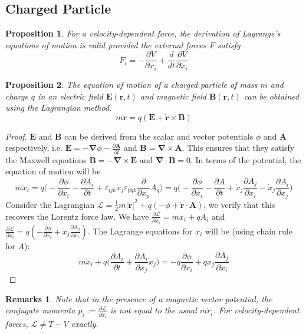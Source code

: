 \documentclass[a4paper]{article}
\newtheorem{remarks}{Remarks}[section]
\newtheorem{prop}{Proposition}[section]
\theoremstyle{new}
\begin{document}
\subsection{Charged Particle}
\begin{prop}
For a velocity-dependent force, the derivation of Lagrange's equations of motion is valid provided the external forces $F$ satisfy
$$F_i=-\frac{\partial V}{\partial x_i}+\frac{d}{dt}\frac{\partial V}{\partial\dot{x}_i}$$
\end{prop}
\begin{prop}
The equation of motion of a charged particle of mass $m$ and charge $q$ in an electric field $\mathbf{E}(\mathbf{r},t)$ and magnetic field $\mathbf{B}(\mathbf{r},t)$ can be obtained using the Lagrangian method.
$$m\mathbf{\ddot{r}}=q(\mathbf{E}+\mathbf{\dot{r}}\times\mathbf{B})$$
\end{prop}
\begin{proof}
$\mathbf{E}$ and $\mathbf{B}$ can be derived from the scalar and vector potentials $\phi$ and $\mathbf{A}$ respectively, i.e. $\mathbf{E}=-\boldsymbol{\nabla}\phi-\frac{\partial\mathbf{A}}{\partial t}$ and $\mathbf{B}=\boldsymbol{\nabla}\times\mathbf{A}$. This ensures that they satisfy the Maxwell equations $\mathbf{\dot{B}}=-\boldsymbol{\nabla}\times\mathbf{E}$ and $\boldsymbol{\nabla}\cdot\mathbf{B}=0$. In terms of the potential, the equation of motion will be
$$m\ddot{x}_i=q\bigg(-\frac{\partial\phi}{\partial x_i}-\frac{\partial A_i}{\partial t}+\varepsilon_{ijk}\dot{x}_j\varepsilon_{pqk}\frac{\partial}{\partial x_p}A_q\bigg)=q\bigg(-\frac{\partial\phi}{\partial x_i}-\frac{\partial A}{\partial t}+\dot{x}_j\frac{\partial A_j}{\partial x_i}-\dot{x}_j\frac{\partial A_i}{\partial x_j}\bigg)$$
Consider the Lagrangian $\mathcal{L}=\frac{1}{2}m|\mathbf{\dot{r}}|^2+q(-\phi+\mathbf{\dot{r}}\cdot\mathbf{A})$, we verify that this recovers the Lorentz force law. We have $\frac{\partial\mathcal{L}}{\partial\dot{x}_i}=m\dot{x}_i+qA_i$ and $\frac{\partial\mathcal{L}}{\partial x_i}=q(-\frac{\partial\phi}{\partial x_i}+\dot{x}_j\frac{\partial A_j}{\partial x_i})$. The Lagrange equations for $x_i$ will be (using chain rule for $A$):
$$m\ddot{x}_i+q\bigg(\frac{\partial A_i}{\partial t}+\frac{\partial A_i}{\partial x_j}\dot{x}_j\bigg)=-q\frac{\partial\phi}{\partial x_i}+q\dot{x}_j\frac{\partial A_j}{\partial x_i}$$
\end{proof}
\begin{remarks}
Note that in the presence of a magnetic vector potential, the conjugate momenta $p_i:=\frac{\partial\mathcal{L}}{\partial\dot{x}_i}$ is not equal to the usual $m\dot{r}_i$. For velocity-dependent forces, $\mathcal{L}\neq T-V$ exactly.
\end{remarks}
\end{document}
